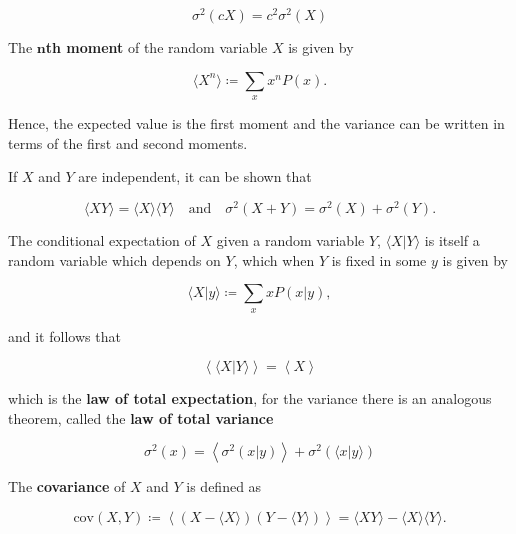 \begin{equation}
  \label{eq:con-var_const}
  \sigma^2(cX) = c^2\sigma^2(X)
\end{equation}

The $\mathbf{n}$\textbf{th moment} of the random variable $X$ is given by

\begin{equation*}
  \langle X^n\rangle \coloneqq \sum_xx^nP(x).
\end{equation*}

Hence, the expected value is the first moment and the variance can be written in terms of the first and second moments.

If $X$ and $Y$ are independent, it can be shown that

\begin{equation}
  \label {eq:con-mom_ind}
  \langle XY\rangle = \langle X\rangle\langle Y\rangle \quad\text{and}\quad \sigma^2(X+Y) = \sigma^2(X)+\sigma^2(Y).
\end{equation}

The conditional expectation of $X$ given a random variable $Y$, $\langle X|Y\rangle$ is itself a random variable which depends on $Y$, which when $Y$ is fixed in some $y$ is given by

\begin{equation*}
  \langle X|y\rangle \coloneqq \sum_xxP(x|y),
\end{equation*}

and it follows that

\begin{equation}
  \label{eq:con-total_exp}
  \left\langle\langle X|Y\rangle\right\rangle = \left\langle X\right\rangle
\end{equation}

which is the \textbf{law of total expectation}, for the variance there is an analogous theorem, called the \textbf{law of total variance}

\begin{equation}
  \label{eq:con-total_var}
  \sigma^2(x) = \left\langle\sigma^2(x|y)\right\rangle + \sigma^2\left(\langle x|y\rangle\right)
\end{equation}

The \textbf{covariance} of $X$ and $Y$ is defined as

\begin{equation*}
  \text{cov}(X,Y) \coloneqq \left\langle\left(X-\langle X\rangle\right)\left(Y-\langle Y\rangle\right)\right\rangle = \langle XY\rangle - \langle X\rangle\langle Y\rangle.
\end{equation*}

